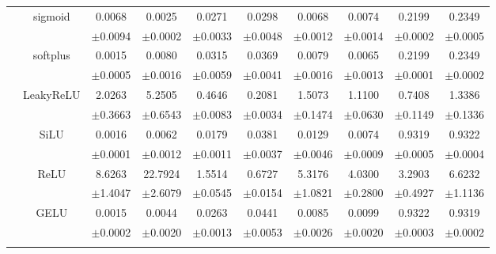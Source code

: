 \documentclass{article}
\begin{document}
\begin{longtable}[h!]{cccccccccc}
        & \multirow{2}{*}{sigmoid}
        &0.0068 & 0.0025 & 0.0271 & 0.0298 & 0.0068 & 0.0074 & 0.2199 & 0.2349\\
        &&\scriptsize $\pm$0.0094&\scriptsize$\pm$0.0002&\scriptsize$\pm$0.0033&\scriptsize$\pm$0.0048&\scriptsize$\pm$0.0012&\scriptsize$\pm$0.0014&\scriptsize$\pm$0.0002&\scriptsize$\pm$0.0005\\
        \cline{3-10}\rule{0pt}{2.3ex}

        & \multirow{2}{*}{softplus}
        &0.0015 & 0.0080 & 0.0315 & 0.0369 & 0.0079 & 0.0065 & 0.2199 & 0.2349\\
        &&\scriptsize $\pm$0.0005&\scriptsize$\pm$0.0016&\scriptsize$\pm$0.0059&\scriptsize$\pm$0.0041&\scriptsize$\pm$0.0016&\scriptsize$\pm$0.0013&\scriptsize$\pm$0.0001&\scriptsize$\pm$0.0002\\
        \cline{3-10}\rule{0pt}{2.3ex}

        & \multirow{2}{*}{LeakyReLU}
        &2.0263 & 5.2505 & 0.4646 & 0.2081 & 1.5073 & 1.1100 & 0.7408 & 1.3386\\
        &&\scriptsize $\pm$0.3663&\scriptsize$\pm$0.6543&\scriptsize$\pm$0.0083&\scriptsize$\pm$0.0034&\scriptsize$\pm$0.1474&\scriptsize$\pm$0.0630&\scriptsize$\pm$0.1149&\scriptsize$\pm$0.1336\\

        \hline\rule{0pt}{2.3ex}

        \multirow{14}{*}{\textsf{MAE\textsubscript{$\Delta$np}}} 
        & \multirow{2}{*}{SiLU}
        & {0.0016} & {0.0062} & {0.0179} & {0.0381} & {0.0129} & {0.0074} & {0.9319} & {0.9322} \\
        && \scriptsize {$\pm$0.0001} & \scriptsize {$\pm$0.0012} & \scriptsize {$\pm$0.0011} & \scriptsize {$\pm$0.0037} & \scriptsize {$\pm$0.0046} & \scriptsize {$\pm$0.0009} & \scriptsize {$\pm$0.0005} & \scriptsize {$\pm$0.0004}\\
        \cline{3-10}\rule{0pt}{2.3ex}

        & \multirow{2}{*}{ReLU}
        &8.6263 & 22.7924 & 1.5514 & 0.6727 & 5.3176 & 4.0300 & 3.2903 & 6.6232\\
        &&\scriptsize $\pm$1.4047&\scriptsize$\pm$2.6079&\scriptsize$\pm$0.0545&\scriptsize$\pm$0.0154&\scriptsize$\pm$1.0821&\scriptsize$\pm$0.2800&\scriptsize$\pm$0.4927&\scriptsize$\pm$1.1136\\
        \cline{3-10}\rule{0pt}{2.3ex}

        & \multirow{2}{*}{GELU}
        &0.0015 & 0.0044 & 0.0263 & 0.0441 & 0.0085 & 0.0099 & 0.9322 & 0.9319\\
        &&\scriptsize $\pm$0.0002&\scriptsize$\pm$0.0020&\scriptsize$\pm$0.0013&\scriptsize$\pm$0.0053&\scriptsize$\pm$0.0026&\scriptsize$\pm$0.0020&\scriptsize$\pm$0.0003&\scriptsize$\pm$0.0002\\
        \cline{3-10}\rule{0pt}{2.3ex}


\end{longtable}
\end{document}
